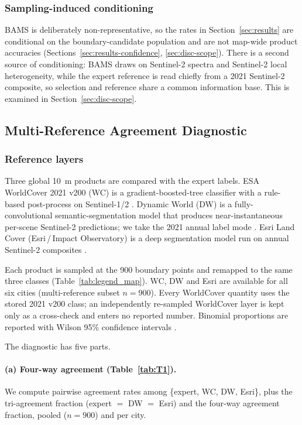 \documentclass[remotesensing,article,submit,moreauthors]{Definitions/mdpi}
\begin{document}
\subsubsection*{Sampling-induced conditioning}

BAMS is deliberately non-representative, so the rates in
Section~\ref{sec:results} are conditional on the boundary-candidate population
and are not map-wide product accuracies (Sections~\ref{sec:results-confidence},
\ref{sec:disc-scope}). There is a second source of conditioning: BAMS draws on
Sentinel-2 spectra and Sentinel-2 local heterogeneity, while the expert
reference is read chiefly from a 2021 Sentinel-2 composite, so selection and
reference share a common information base. This is examined in
Section~\ref{sec:disc-scope}.

\subsection{Multi-Reference Agreement Diagnostic}\label{sec:diagnostic}

\subsubsection*{Reference layers}

Three global 10~m products are compared with the expert labels. ESA WorldCover
2021 v200 (WC) is a gradient-boosted-tree classifier with a rule-based
post-process on Sentinel-1/2 \citep{zanaga2022}. Dynamic World (DW) is a
fully-convolutional semantic-segmentation model that produces
near-instantaneous per-scene Sentinel-2 predictions; we take the 2021 annual
label mode \citep{brown2022}. Esri Land Cover (Esri\,/\,Impact Observatory) is
a deep segmentation model run on annual Sentinel-2 composites \citep{karra2021}.

Each product is sampled at the 900 boundary points and remapped to the same
three classes (Table~\ref{tab:legend_map}). WC, DW and Esri are available for
all six cities (multi-reference subset $n = 900$). Every WorldCover quantity
uses the stored 2021 v200 class; an independently re-sampled WorldCover layer is
kept only as a cross-check and enters no reported number. Binomial proportions
are reported with Wilson 95\% confidence intervals \citep{wilson1927}.

The diagnostic has five parts.

\paragraph{(a) Four-way agreement (Table~\ref{tab:T1}).}
We compute pairwise agreement rates among \{expert, WC, DW, Esri\}, plus the
tri-agreement fraction (expert $=$ DW $=$ Esri) and the four-way agreement
fraction, pooled ($n = 900$) and per city.
\end{document}
